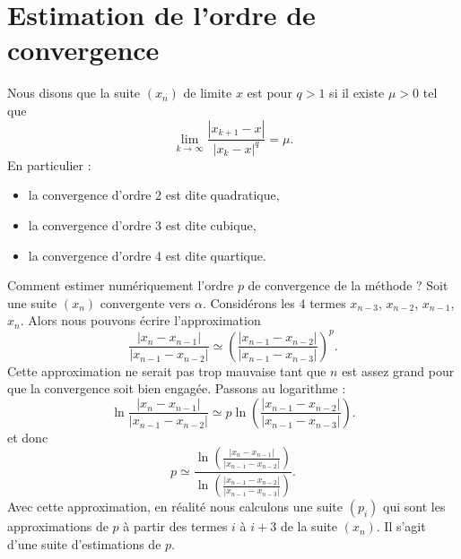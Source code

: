 
\section{Estimation de l'ordre de convergence}

\begin{definition}
	Nous disons que la suite \( (x_n)\) de limite \( x\) est  pour \( q>1\) si il existe \( \mu>0\) tel que
	\begin{equation}
		\lim_{k\to \infty} \frac{ | x_{k+1}-x | }{ | x_k-x |^q }=\mu.
	\end{equation}
	En particulier :
	\begin{itemize}
		\item
		      la convergence d'ordre 2 est dite quadratique,
		\item
		      la convergence d'ordre 3 est dite cubique,
		\item
		      la convergence d'ordre 4 est dite quartique.
	\end{itemize}
\end{definition}

Comment estimer numériquement l'ordre \( p\) de convergence de la méthode ? Soit une suite \( (x_n)\) convergente vers \( \alpha\). Considérons les \( 4\) termes \( x_{n-3}\), \( x_{n-2}\), \( x_{n-1}\), \( x_n\). Alors nous pouvons écrire l'approximation
\begin{equation}
	\frac{ | x_n -x_{n-1}| }{ | x_{n-1}-x_{n-2} | }\simeq \left( \frac{ | x_{n-1}-x_{n-2} | }{ | x_{n-1}-x_{n-3} | } \right)^p.
\end{equation}
Cette approximation ne serait pas trop mauvaise tant que \( n\) est assez grand pour que la convergence soit bien engagée. Passons au logarithme :
\begin{equation}
	\ln \frac{ | x_n -x_{n-1}| }{ | x_{n-1}-x_{n-2} | }\simeq p\ln \left( \frac{ | x_{n-1}-x_{n-2} | }{ | x_{n-1}-x_{n-3} | } \right).
\end{equation}
et donc
\begin{equation}
	p\simeq \frac{ \ln\left( \frac{ | x_n -x_{n-1}| }{ | x_{n-1}-x_{n-2} | } \right) }{ \ln \left(\frac{ | x_{n-1}-x_{n-2} | }{ | x_{n-1}-x_{n-3} | } \right)}.
\end{equation}
Avec cette approximation, en réalité nous calculons une suite \( (p_i)\) qui sont les approximations de \( p\) à partir des termes \( i\) à \(i+3 \) de la suite \( (x_n)\). Il s'agit d'une suite d'estimations de \( p\).

